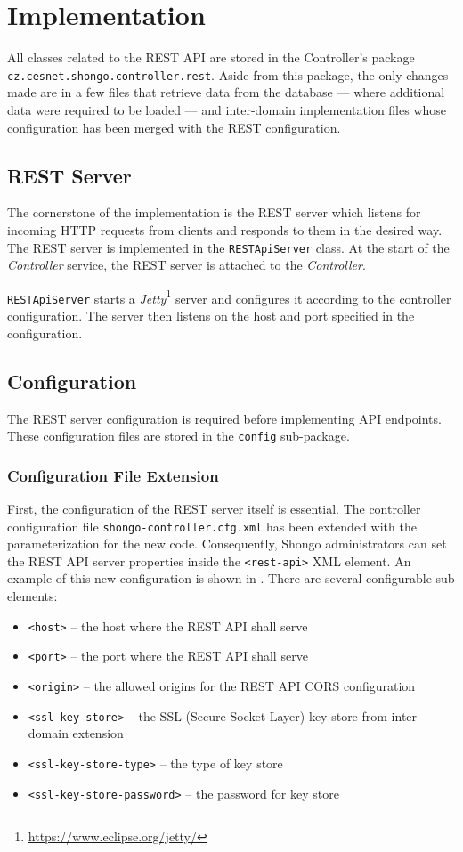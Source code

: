 \chapter{Implementation} \label{cha:implementation}
All classes related to the REST API are stored in the Controller’s package  \texttt{cz.cesnet.shongo.controller.rest}.
Aside from this package, the only changes made are in a few files that retrieve data from the database --- where additional data were required to be loaded --- and inter-domain implementation files\cite{pavelka2016shongo} whose configuration has been merged with the REST configuration.

\section{REST Server}
The cornerstone of the implementation is the REST server which listens for incoming HTTP requests from clients and responds to them in the desired way. The REST server is implemented in the \texttt{RESTApiServer} class.
At the start of the \emph{Controller} service, the REST server is attached to the \emph{Controller}.

\texttt{RESTApiServer} starts a \emph{Jetty}\footnote{\url{https://www.eclipse.org/jetty/}} server and configures it according to the controller configuration. The server then listens on the host and port specified in the configuration.

\section{Configuration}
The REST server configuration is required before implementing API endpoints. These configuration files are stored in the \texttt{config} sub-package.

\subsection{Configuration File Extension}
First, the configuration of the REST server itself is essential. The controller configuration file \texttt{shongo-controller.cfg.xml} has been extended with the parameterization for the new code. Consequently, Shongo administrators can set the REST API server properties inside the \texttt{<rest-api>} XML element. An example of this new configuration is shown in . There are several configurable sub elements:
\begin{itemize}
    \item \texttt{<host>} -- the host where the REST API shall serve
    \item \texttt{<port>} -- the port where the REST API shall serve
    \item \texttt{<origin>} -- the allowed origins for the REST API CORS configuration
    \item \texttt{<ssl-key-store>} -- the SSL (Secure Socket Layer) key store from inter-domain extension \cite{pavelka2016shongo}
    \item \texttt{<ssl-key-store-type>} -- the type of key store
    \item \texttt{<ssl-key-store-password>} -- the password for key store
\end{itemize}

